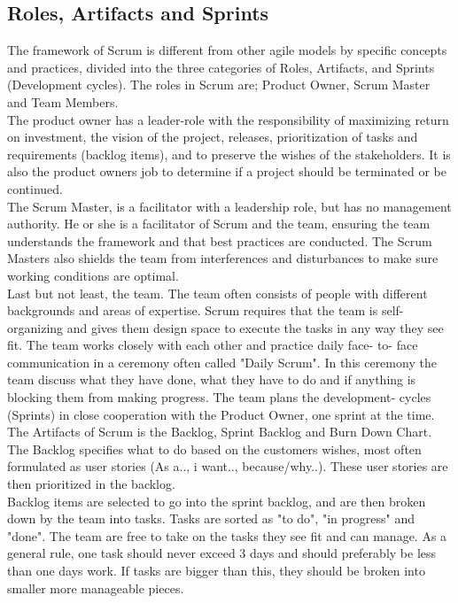 \subsection {Roles, Artifacts and Sprints}
The framework of Scrum is different from other agile models by specific concepts and practices, divided into the three categories of Roles, Artifacts, and Sprints (Development cycles). The roles in Scrum are; Product Owner, Scrum Master and Team Members. 
\\
\newline
The product owner has a leader-role with the responsibility of maximizing return on investment, the vision of the project, releases, prioritization of tasks and requirements (backlog items), and to preserve the wishes of the stakeholders. It is also the product owners job to determine if a project should be terminated or be continued.
\\
\newline
The Scrum Master, is a facilitator with a leadership role, but has no management authority. He or she is a facilitator of Scrum and the team, ensuring the team understands the framework and that best practices are conducted. The Scrum Masters also shields the team from interferences and disturbances to make sure working conditions are optimal.
\\
\newline
Last but not least, the team. The team often consists of people with different backgrounds and areas of expertise. Scrum requires that the team is self-organizing and gives them design space to execute the tasks in any way they see fit. The team works closely with each other and practice daily face- to- face communication in a ceremony often called "Daily Scrum". In this ceremony the team discuss what they have done, what they have to do and if anything is blocking them from making progress. The team plans the development- cycles (Sprints) in close cooperation with the Product Owner, one sprint at the time. 
\\
\newline
The Artifacts of Scrum is the Backlog, Sprint Backlog and Burn Down Chart. The Backlog specifies what to do based on the customers wishes, most often formulated as user stories (As a.., i want.., because/why..). These user stories are then prioritized in the backlog.
\\
\newline
Backlog items are selected to go into the sprint backlog, and are then broken down by the team into tasks. Tasks are sorted as "to do", "in progress" and "done". The team are free to take on the tasks they see fit and can manage. As a general rule, one task should never exceed 3 days and should preferably be less than one days work. If tasks are bigger than this, they should be broken into smaller more manageable pieces.
